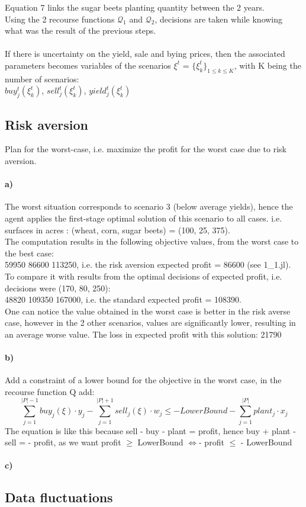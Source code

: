 \documentclass[12pt]{article}
\begin{document}
Equation 7 links the sugar beets planting quantity between the 2 years.\\
Using the 2 recourse functions $\mathcal{Q}_1$ and $\mathcal{Q}_2$, decisions are taken while knowing what was the result of the previous steps.\\\\
If there is uncertainty on the yield, sale and bying prices, then the associated parameters becomes variables of the scenarios $\xi^t$ = $\{\xi_k^t\}_{1\leq k \leq K}$, with K being the number of scenarios:\\
$buy_j^t(\xi_k^t)$, $sell_j^t(\xi_k^t)$, $yield_j^t(\xi_k^t)$

\subsection{Risk aversion}
\setcounter{equation}{0}
Plan for the worst-case, i.e. maximize the profit for the worst case due to risk aversion.\\

\paragraph{a)}
The worst situation corresponds to scenario 3 (below average yields), hence the agent applies the first-stage optimal solution of this scenario to all cases.
i.e. surfaces in acres : (wheat, corn, sugar beets) = (100, 25, 375).\\
The computation results in the following objective values, from the worst case to the best case:\\59950 86600 113250, i.e. the risk aversion expected profit = 86600 (see 1\_1.jl).\\
To compare it with results from the optimal decisions of expected profit, i.e. decisions were (170, 80, 250):\\ 48820 109350 167000, i.e. the standard expected profit = 108390.\\
One can notice the value obtained in the worst case is better in the risk averse case, however in the 2 other scenarios, values are significantly lower, resulting in an average worse value. The loss in expected profit with this solution: 21790\\

\paragraph{b)}
Add a constraint of a lower bound for the objective in the worst case, in the recourse function $\mathrm{Q}$ add:\\
\begin{equation}
\sum\limits_{j=1}^{|P|-1} buy_j(\xi) \cdot y_j - \sum\limits_{j=1}^{|P|+1} sell_j(\xi) \cdot w_j \leq - LowerBound - \sum\limits_{j=1}^{|P|} plant_j \cdot x_j 
\end{equation}
The equation is like this because sell - buy - plant = profit, hence buy + plant - sell = - profit, as we want profit $\geq$ LowerBound $\iff$- profit $\leq$ - LowerBound

\paragraph{c)}


\subsection{Data fluctuations}
\end{document}
